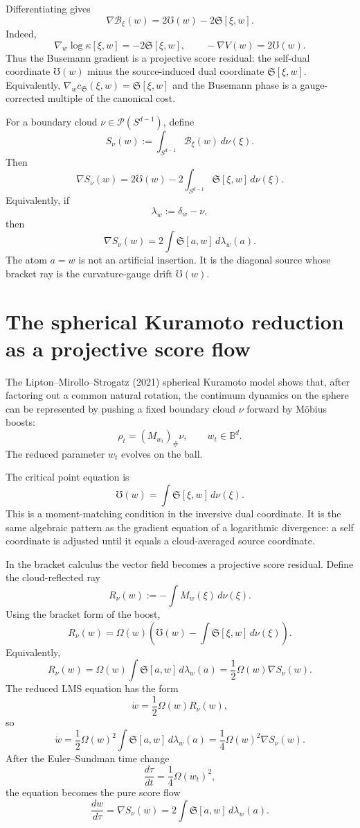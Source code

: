 \documentclass[11pt]{article}
\newcommand{\B}{\mathbb{B}}
\newcommand{\Sph}{{S}}
\newcommand{\push}{\#}
\newcommand{\cs}{c_{\mathfrak S}}
\newcommand{\grad}{\nabla}
\newcommand{\UU}{\mho}
\newcommand{\Mob}{M}
\newcommand{\Sbr}[2]{\mathfrak S[#1,#2]}
\newcommand{\kap}[2]{\kappa[#1,#2]}
\newcommand{\Om}{\Omega}
\newcommand{\calB}{\mathcal B}
\begin{document}
Differentiating gives
\[
    \boxed{
    \grad\calB_\xi(w)=2\UU(w)-2\Sbr{\xi}{w}.
    }
\]
Indeed,
\[
    \grad_w\log\kap{\xi}{w}=-2\Sbr{\xi}{w},
    \qquad
    -\grad V(w)=2\UU(w).
\]
Thus the Busemann gradient is a projective score residual: the self-dual coordinate $\UU(w)$ minus the source-induced dual coordinate $\Sbr{\xi}{w}$.  Equivalently, $\grad_w\cs(\xi,w)=\Sbr{\xi}{w}$ and the Busemann phase is a gauge-corrected multiple of the canonical cost.

For a boundary cloud $\nu\in\mathcal P(\Sph^{d-1})$, define
\[
    S_\nu(w):=\int_{\Sph^{d-1}}\calB_\xi(w)\,d\nu(\xi).
\]
Then
\[
    \boxed{
    \grad S_\nu(w)=2\UU(w)-2\int_{\Sph^{d-1}}\Sbr{\xi}{w}\,d\nu(\xi).
    }
\]
Equivalently, if
\[
    \lambda_w:=\delta_w-\nu,
\]
then
\[
    \boxed{
    \grad S_\nu(w)=2\int\Sbr{a}{w}\,d\lambda_w(a).
    }
\]
The atom $a=w$ is not an artificial insertion.  It is the diagonal source whose bracket ray is the curvature-gauge drift $\UU(w)$.


\section{The spherical Kuramoto reduction as a projective score flow}

The Lipton--Mirollo--Strogatz (2021) spherical Kuramoto model shows that, after factoring out a common natural rotation, the continuum dynamics on the sphere can be represented by pushing a fixed boundary cloud $\nu$ forward by Möbius boosts:
\[
    \rho_t=(\Mob_{w_t})_{\push}\nu,
    \qquad
    w_t\in\B^d.
\]
The reduced parameter $w_t$ evolves on the ball.  

The critical point equation is
\[
    \UU(w)=\int\Sbr{\xi}{w}\,d\nu(\xi).
\]
This is a moment-matching condition in the inversive dual coordinate.  It is the same algebraic pattern as the gradient equation of a logarithmic divergence: a self coordinate is adjusted until it equals a cloud-averaged source coordinate.


In the bracket calculus the vector field becomes a projective score residual.
Define the cloud-reflected ray
\[
    R_\nu(w):=-\int\Mob_w(\xi)\,d\nu(\xi).
\]
Using the bracket form of the boost,
\[
    R_\nu(w)=\Om(w)\left(\UU(w)-\int\Sbr{\xi}{w}\,d\nu(\xi)\right).
\]
Equivalently,
\[
    \boxed{
    R_\nu(w)=\Om(w)\int\Sbr{a}{w}\,d\lambda_w(a)
    =\frac12\Om(w)\grad S_\nu(w).
    }
\]
The reduced LMS equation has the form
\[
    \dot w=\frac12\Om(w)R_\nu(w),
\]
so
\[
    \boxed{
    \dot w=\frac12\Om(w)^2\int\Sbr{a}{w}\,d\lambda_w(a)
    =\frac14\Om(w)^2\grad S_\nu(w).
    }
\]
After the Euler--Sundman time change
\[
    \frac{d\tau}{dt}=\frac14\Om(w_t)^2,
\]
the equation becomes the pure score flow
\[
    \boxed{
    \frac{dw}{d\tau}=\grad S_\nu(w)=2\int\Sbr{a}{w}\,d\lambda_w(a).
    }
\]
\end{document}
